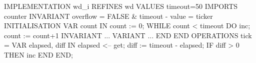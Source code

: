 \documentclass[10pt,a4paper]{article}
\begin{document}
\begin{pascalcode}
IMPLEMENTATION wd_i
REFINES wd
VALUES timeout=50
IMPORTS counter
INVARIANT overflow = FALSE & timeout - value = ticker
INITIALISATION
   VAR count IN
       count := 0;
       WHILE count < timeout DO
           inc; count := count+1
       INVARIANT ... VARIANT ...
       END
   END
OPERATIONS
   tick =
   VAR elapsed, diff IN
       elapsed <-- get;
       diff := timeout - elapsed;
       IF diff > 0 THEN inc END
END;
\end{pascalcode}
\end{document}
